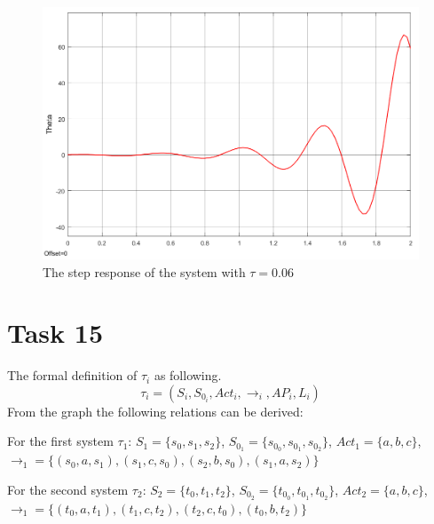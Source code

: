 \documentclass[a4paper,12pt,oneside,onecolumn]{article} %
\begin{document}
\begin{figure}[H]
    \centering
    \includegraphics[scale=0.5]{Task_14_06.png}
    \caption{The step response of the system with $\tau=0.06$}
    \label{fig:18}
\end{figure}


\section*{Task 15}
The formal definition of $\tau_i$ as following.
\begin{equation}
    \tau_i =  (S_i,S_{0_i} ,Act_i, \rightarrow_i, AP_i, L_i)
\end{equation}
From the graph the following relations can be derived:

For the first system $\tau_1$: 
$S_1 = \{s_0, s_1, s_2\}$, $S_{0_1} = \{s_{0_0}, s_{0_1}, s_{0_2}\}$, $Act_1 = \{a, b, c\}$, 
$\rightarrow_1 = \{(s_0, a, s_1), (s_1, c, s_0), (s_2, b, s_0), (s_1, a, s_2)\}$ 

For the second system $\tau_2$: 
$S_2 = \{t_0, t_1, t_2\}$, $S_{0_2} = \{t_{0_0}, t_{0_1}, t_{0_2}\}$, $Act_2 = \{a, b, c\}$, 
$\rightarrow_1 = \{(t_0, a, t_1), (t_1, c, t_2), (t_2, c, t_0), (t_0, b, t_2)\}$
\end{document}
